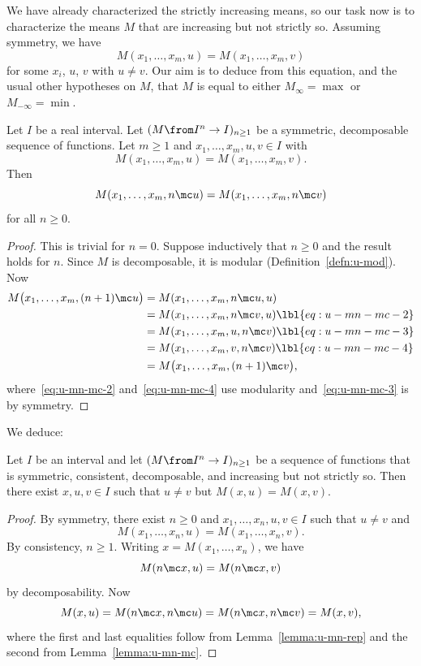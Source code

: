 We have already characterized the strictly increasing means, so our task
now is to characterize the means $M$ that are increasing but not strictly
so.  Assuming symmetry, we have
\[
M(x_1, \ldots, x_m, u) = M(x_1, \ldots, x_m, v)
\]
for some $x_i$, $u$, $v$ with $u \neq v$.  Our aim is to deduce from this
equation, and the usual other hypotheses on $M$, that $M$ is equal to
either $M_\infty = \max$ or $M_{-\infty} = \min$.  

\begin{lemma}
Let $I$ be a real interval.  Let $(M \from I^n \to I)_{n \geq 1}$ be a
symmetric, decomposable sequence of functions.  Let $m \geq 1$ and $x_1,
\ldots, x_m, u, v \in I$ with
\[
M(x_1, \ldots, x_m, u)
=
M(x_1, \ldots, x_m, v).
\]
Then
\[
M(x_1, \ldots, x_m, n \mc u)
=
M(x_1, \ldots, x_m, n \mc v)
\]
for all $n \geq 0$.
\end{lemma}

\begin{proof}
This is trivial for $n = 0$.  Suppose inductively that $n \geq 0$ and the
result holds for $n$.  Since $M$ is decomposable, it is modular
(Definition~\ref{defn:u-mod}).  Now
% 
\begin{align}
M\bigl(x_1, \ldots, x_m, (n + 1) \mc u\bigr)    &
=
M(x_1, \ldots, x_m, n \mc u, u)
\nonumber       \\
&
=
M(x_1, \ldots, x_m, n \mc v, u)
\lbl{eq:u-mn-mc-2}    \\
&
=
M(x_1, \ldots, x_m, u, n \mc v)
\lbl{eq:u-mn-mc-3}    \\  
&
=
M(x_1, \ldots, x_m, v, n \mc v)
\lbl{eq:u-mn-mc-4}    \\  
&
=
M\bigl(x_1, \ldots, x_m, (n + 1) \mc v\bigr),
\nonumber
\end{align}
% 
where~\eqref{eq:u-mn-mc-2} and~\eqref{eq:u-mn-mc-4} use modularity
and~\eqref{eq:u-mn-mc-3} is by symmetry.
\end{proof}

We deduce:

\begin{lemma}
Let $I$ be an interval and let $(M \from I^n \to I)_{n \geq 1}$ be a
sequence of functions that is symmetric, consistent, decomposable, and
increasing but not strictly so.  Then there exist $x, u, v \in I$ such that
$u \neq v$ but $M(x, u) = M(x, v)$.
\end{lemma}

\begin{proof}
By symmetry, there exist $n \geq 0$ and $x_1, \ldots, x_n, u, v \in I$ such
that $u \neq v$ and
\[
M(x_1, \ldots, x_n, u) = M(x_1, \ldots, x_n, v).
\]
By consistency, $n \geq 1$.  Writing $x = M(x_1, \ldots, x_n)$, we have
\[
M(n \mc x, u) = M(n \mc x, v)
\]
by decomposability.  Now
\[
M(x, u)
=
M(n \mc x, n \mc u)
=
M(n \mc x, n \mc v)
=
M(x, v),
\]
where the first and last equalities follow from Lemma~\ref{lemma:u-mn-rep}
and the second from Lemma~\ref{lemma:u-mn-mc}.
\end{proof}

